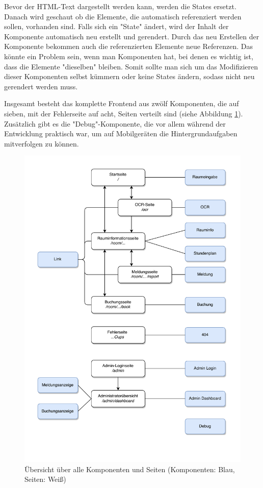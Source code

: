 Bevor der HTML-Text dargestellt werden kann, werden die States ersetzt. Danach wird geschaut ob die Elemente, die automatisch referenziert werden sollen, vorhanden sind. Falls sich ein "State" ändert, wird der Inhalt der Komponente automatisch neu erstellt und gerendert. Durch das neu Erstellen der Komponente bekommen auch die referenzierten Elemente neue Referenzen. Das könnte ein Problem sein, wenn man Komponenten hat, bei denen es wichtig ist, dass die Elemente "dieselben" bleiben. Somit sollte man sich um das Modifizieren dieser Komponenten selbst kümmern oder keine States ändern, sodass nicht neu gerendert werden muss.


Insgesamt besteht das komplette Frontend aus zwölf Komponenten, die auf sieben, mit der Fehlerseite auf acht, Seiten verteilt sind (siehe Abbildung \ref{fig:comppageoverview}). Zusätzlich gibt es die "Debug"-Komponente, die vor allem während der Entwicklung praktisch war, um auf Mobilgeräten die Hintergrundaufgaben mitverfolgen zu können.

\begin{figure}[H]
    \centering
    \includegraphics[width=150mm]{media/WebComponents/overview.svg.pdf}
    \caption{Übersicht über alle Komponenten und Seiten (Komponenten: Blau, Seiten: Weiß)}
    \label{fig:comppageoverview}
\end{figure}

